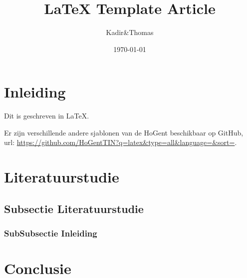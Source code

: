 \documentclass[a4paper,12pt]{article}
\title{\LaTeX{} Template Article}
\author{Kadir\&Thomas}
\date{\today}
\begin{document}
    \maketitle
    
    \tableofcontents
    
    
    \section{Inleiding}
    
    Dit is geschreven in \LaTeX{}.
    
    Er zijn verschillende andere sjablonen van de HoGent beschikbaar op GitHub, url: \url{https://github.com/HoGentTIN?q=latex&type=all&language=&sort=}. 
    
    \lipsum[1,2]
    
    \section{Literatuurstudie}
    \subsection{Subsectie Literatuurstudie}
    \lipsum[3,5]
    \subsubsection{SubSubsectie Inleiding}
    \lipsum[5,7]
    
    \section{Conclusie}
    \lipsum[8,9]
\end{document}
